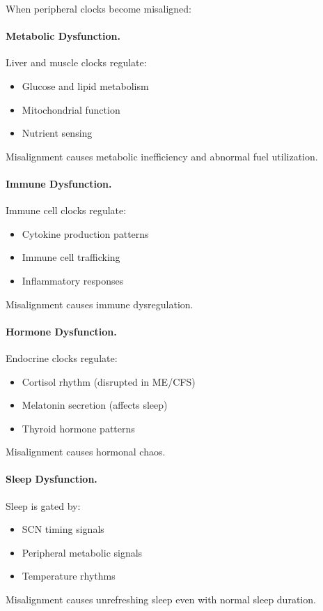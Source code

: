 When peripheral clocks become misaligned:

\paragraph{Metabolic Dysfunction.} Liver and muscle clocks regulate:
\begin{itemize}
    \item Glucose and lipid metabolism
    \item Mitochondrial function
    \item Nutrient sensing
\end{itemize}
Misalignment causes metabolic inefficiency and abnormal fuel utilization.

\paragraph{Immune Dysfunction.} Immune cell clocks regulate:
\begin{itemize}
    \item Cytokine production patterns
    \item Immune cell trafficking
    \item Inflammatory responses
\end{itemize}
Misalignment causes immune dysregulation.

\paragraph{Hormone Dysfunction.} Endocrine clocks regulate:
\begin{itemize}
    \item Cortisol rhythm (disrupted in ME/CFS)
    \item Melatonin secretion (affects sleep)
    \item Thyroid hormone patterns
\end{itemize}
Misalignment causes hormonal chaos.

\paragraph{Sleep Dysfunction.} Sleep is gated by:
\begin{itemize}
    \item SCN timing signals
    \item Peripheral metabolic signals
    \item Temperature rhythms
\end{itemize}
Misalignment causes unrefreshing sleep even with normal sleep duration.

